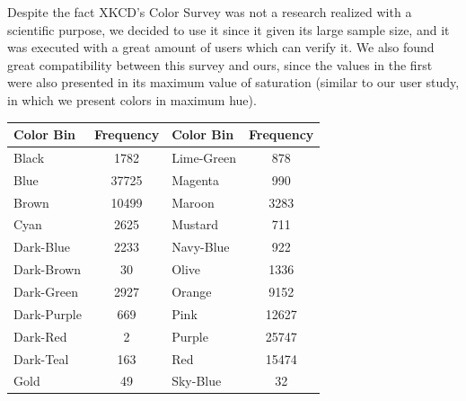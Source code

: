 %
Despite the fact XKCD's Color Survey was not a research realized with a scientific purpose, we decided to use it since it given its large sample size, and it was executed with a great amount of users
which can verify it. We also found great compatibility between this survey and ours, since the values in the first were also presented in its maximum value of saturation (similar to our user study, in which we present colors in maximum hue).
%
\begin{table}[!htbp]
  \begin{center}
    \resizebox{0.3\textwidth}{!} {
    \begin{tabular}{@{}lclc@{}}
    \toprule
      Color Bin                        & Frequency                  & Color Bin                       & Frequency \\ \midrule
      \multicolumn{1}{l|}{Black}       & \multicolumn{1}{c||}{1782}  & \multicolumn{1}{l|}{Lime-Green} & 878       \\ \midrule
      \multicolumn{1}{l|}{Blue}        & \multicolumn{1}{c||}{37725} & \multicolumn{1}{l|}{Magenta}    & 990       \\ \midrule
      \multicolumn{1}{l|}{Brown}       & \multicolumn{1}{c||}{10499} & \multicolumn{1}{l|}{Maroon}     & 3283      \\ \midrule
      \multicolumn{1}{l|}{Cyan}        & \multicolumn{1}{c||}{2625}  & \multicolumn{1}{l|}{Mustard}    & 711       \\ \midrule
      \multicolumn{1}{l|}{Dark-Blue}   & \multicolumn{1}{c||}{2233}  & \multicolumn{1}{l|}{Navy-Blue}  & 922       \\ \midrule
      \multicolumn{1}{l|}{Dark-Brown}  & \multicolumn{1}{c||}{30}    & \multicolumn{1}{l|}{Olive}      & 1336      \\ \midrule
      \multicolumn{1}{l|}{Dark-Green}  & \multicolumn{1}{c||}{2927}  & \multicolumn{1}{l|}{Orange}     & 9152      \\ \midrule
      \multicolumn{1}{l|}{Dark-Purple} & \multicolumn{1}{c||}{669}   & \multicolumn{1}{l|}{Pink}       & 12627     \\ \midrule
      \multicolumn{1}{l|}{Dark-Red}    & \multicolumn{1}{c||}{2}     & \multicolumn{1}{l|}{Purple}     & 25747     \\ \midrule
      \multicolumn{1}{l|}{Dark-Teal}   & \multicolumn{1}{c||}{163}   & \multicolumn{1}{l|}{Red}        & 15474     \\ \midrule
      \multicolumn{1}{l|}{Gold}        & \multicolumn{1}{c||}{49}    & \multicolumn{1}{l|}{Sky-Blue}   & 32        \\ \midrule

\end{tabular}}
\end{center}
\end{table}

